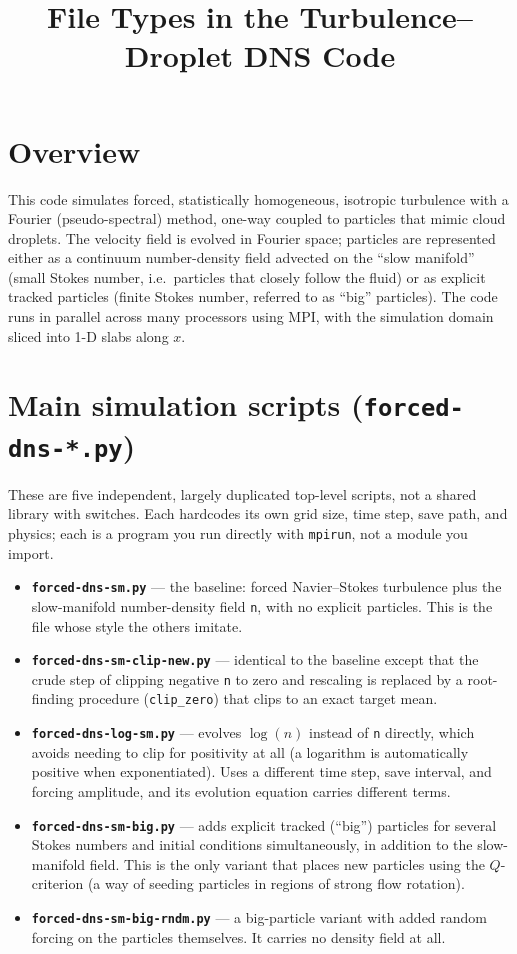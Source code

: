 \documentclass[11pt]{article}
\title{File Types in the Turbulence--Droplet DNS Code}
\author{}
\date{}
\begin{document}
\maketitle

\section{Overview}
This code simulates forced, statistically homogeneous, isotropic
turbulence with a Fourier (pseudo-spectral) method, one-way coupled
to particles that mimic cloud droplets. The velocity field is evolved
in Fourier space; particles are represented either as a continuum
number-density field advected on the ``slow manifold'' (small Stokes
number, i.e.\ particles that closely follow the fluid) or as explicit
tracked particles (finite Stokes number, referred to as ``big''
particles). The code runs in parallel across many processors using
MPI, with the simulation domain sliced into 1-D slabs along $x$.

\section{Main simulation scripts (\texttt{forced-dns-*.py})}
These are five independent, largely duplicated top-level scripts,
not a shared library with switches. Each hardcodes its own grid
size, time step, save path, and physics; each is a program you run
directly with \texttt{mpirun}, not a module you import.

\begin{itemize}[leftmargin=*]
  \item \textbf{\texttt{forced-dns-sm.py}} --- the baseline: forced
    Navier--Stokes turbulence plus the slow-manifold number-density
    field \texttt{n}, with no explicit particles. This is the file
    whose style the others imitate.
  \item \textbf{\texttt{forced-dns-sm-clip-new.py}} --- identical to
    the baseline except that the crude step of clipping negative
    \texttt{n} to zero and rescaling is replaced by a root-finding
    procedure (\texttt{clip\_zero}) that clips to an exact target
    mean.
  \item \textbf{\texttt{forced-dns-log-sm.py}} --- evolves
    $\log(n)$ instead of \texttt{n} directly, which avoids needing
    to clip for positivity at all (a logarithm is automatically
    positive when exponentiated). Uses a different time step,
    save interval, and forcing amplitude, and its evolution equation
    carries different terms.
  \item \textbf{\texttt{forced-dns-sm-big.py}} --- adds explicit
    tracked (``big'') particles for several Stokes numbers and
    initial conditions simultaneously, in addition to the
    slow-manifold field. This is the only variant that places new
    particles using the $Q$-criterion (a way of seeding particles in
    regions of strong flow rotation).
  \item \textbf{\texttt{forced-dns-sm-big-rndm.py}} --- a big-particle
    variant with added random forcing on the particles themselves.
    It carries no density field at all.
\end{itemize}
\end{document}

